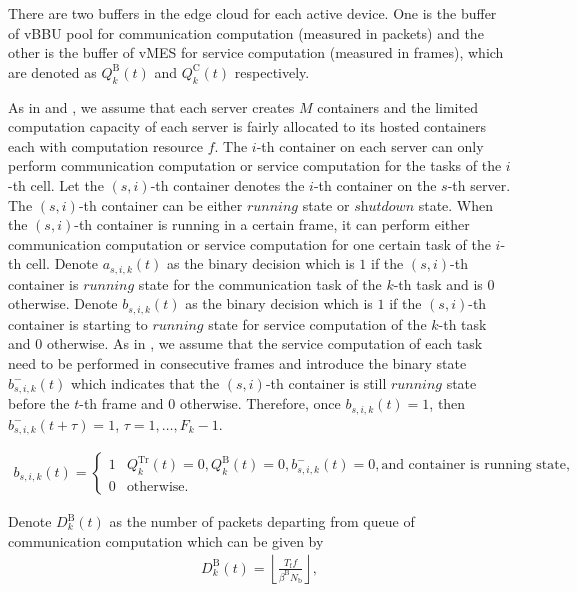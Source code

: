 There are two buffers in the edge cloud for each active device. One is the buffer of vBBU pool for communication computation (measured in packets) and the other is the buffer of vMES for service computation (measured in frames), which are denoted as $Q_{k}^{\mathrm{B}}(t)$ and $Q_{k}^{\mathrm{C}}(t)$ respectively.

As in  and , we assume that each server creates $M$ containers and the limited computation capacity of each server is fairly allocated to its hosted containers each with computation resource $f$. The $i$-th container on each server can only perform communication computation or service computation for the tasks of the $i$-th cell. Let the $(s,i)$-th container denotes the $i$-th container on the $s$-th server. The $(s,i)$-th container can be either $\textit{running}$ state or $\textit{shutdown}$ state. When the $(s,i)$-th container is running in a certain frame, it can perform either communication computation or service computation for one certain task of the $i$-th cell. Denote $a_{s,i,k}(t)$ as the binary decision which is $1$ if the $(s,i)$-th container is $\textit{running}$ state for the communication task of the $k$-th task and is $0$ otherwise. Denote $b_{s,i,k}(t)$ as the binary decision which is $1$ if the $(s,i)$-th container is starting to $\textit{running}$ state for service computation of the $k$-th task and $0$ otherwise. As in \cite{}, we assume that the service computation of each task need to be performed in consecutive frames and introduce the binary state $b_{s,i,k}^{-}(t)$ which indicates that the $(s,i)$-th container is still $\textit{running}$ state before the $t$-th frame and $0$ otherwise. Therefore, once $b_{s,i,k}(t)=1$, then $b_{s,i,k}^{-}(t+\tau)=1$, $\tau=1,\ldots,F_{k}-1$.

\begin{align}
	b_{s,i,k}(t)=
	\begin{cases}
		1 &Q_{k}^{\mathrm{Tr}}(t)=0,Q_{k}^{\mathrm{B}}(t)=0,b_{s,i,k}^{-}(t)=0,\text{and container is running state,}\\
		0 &\text{otherwise}.
	\end{cases}
\end{align}

Denote $D_{k}^{\mathrm{B}}(t)$ as the number of packets departing from queue of communication computation which can be given by
\begin{align}
	D_{k}^{\mathrm{B}}(t)=\left\lfloor\frac{T_{\mathrm{f}}f}{\beta^{\mathrm{B}}N_{\mathrm{b}}}\right\rfloor,
\end{align}

